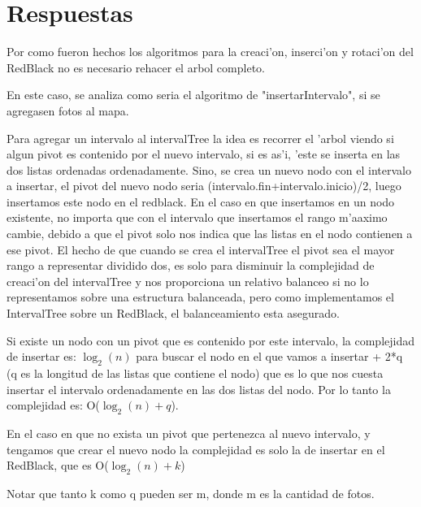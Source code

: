 
\section{Respuestas}

Por como fueron hechos los algoritmos para la creaci'on, inserci'on y rotaci'on del RedBlack no es necesario rehacer el arbol completo. 

En este caso, se analiza como seria el algoritmo de "insertarIntervalo", si se agregasen fotos al mapa.

Para agregar un intervalo al intervalTree la idea es recorrer el 'arbol viendo si algun pivot es contenido por el nuevo intervalo, si es as'i, 'este se inserta en las dos listas ordenadas ordenadamente. Sino, se crea un nuevo nodo con el intervalo a insertar, el pivot del nuevo nodo seria (intervalo.fin+intervalo.inicio)/2, luego insertamos este nodo en el redblack.
En el caso en que insertamos en un nodo existente, no importa que con el intervalo que insertamos el rango m'aaximo cambie, debido a que el pivot solo nos indica que las listas en el nodo contienen a ese pivot. El hecho de que cuando se crea el intervalTree el pivot sea el mayor rango a representar dividido dos, es solo para disminuir la complejidad de creaci'on del intervalTree y nos proporciona un relativo balanceo si no lo representamos sobre una estructura balanceada, pero como implementamos el IntervalTree sobre un RedBlack, el balanceamiento esta asegurado.

Si existe un nodo con un pivot que es contenido por este intervalo, la complejidad de insertar es:
$\log_2(n)$ para buscar el nodo en el que vamos a insertar + 2*q (q es la longitud de las listas que contiene el nodo) que es lo que nos cuesta insertar el intervalo ordenadamente en las dos listas del nodo.
Por lo tanto la complejidad es: O($\log_2(n) + q$).

En el caso en que no exista un pivot que pertenezca al nuevo intervalo, y tengamos que crear el nuevo nodo la complejidad es solo la de insertar en el RedBlack, que es O($\log_2(n)+k$)

Notar que tanto k como q pueden ser m, donde m es la cantidad de fotos.
